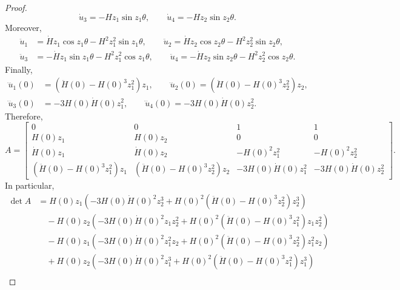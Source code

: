 \documentclass[11pt]{amsart}
\theoremstyle{definition}
\theoremstyle{remark}
\numberwithin{equation}{section}
\begin{document}
\begin{proof}
\begin{equation*}
\dot u_3= -Hz_1\sin z_1 \theta,\qquad
\dot u_4=-Hz_2\sin z_2\theta.
\end{equation*}
Moreover,
\begin{align*}
\ddot u_1&=\dot Hz_1\cos z_1\theta-H^2z_1^2\sin z_1 \theta,\qquad \ddot u_2=\dot Hz_2\cos z_2\theta-H^2z_2^2\sin z_2 \theta,\\
\ddot u_3&=-\dot Hz_1\sin z_1\theta-H^2z_1^2\cos z_1 \theta,\qquad \ddot u_4=-\dot Hz_2\sin z_2\theta-H^2z_2^2\cos z_2 \theta.
\end{align*}
Finally,
\begin{align*}
\dddot u_1(0)&=\left(\ddot H(0)-H(0)^3z_1^2\right)z_1,\qquad  \dddot u_2(0)=\left(\ddot H(0)-H(0)^3z_2^2\right)z_2,\\
\dddot u_3(0)&=-3H(0)\dot H(0)z_1^2,\qquad  \dddot u_4(0)=-3H(0)\dot H(0)z_2^2.
\end{align*}
Therefore, 
\begin{equation*}
A=\begin{bmatrix}
	0 & 0 & 1 & 1 \\
	H(0)z_1 & H(0)z_2 & 0 & 0 \\
	\dot H(0)z_1 & \dot H(0)z_2 & -H(0)^2z_1^2 & -H(0)^2z_2^2 \\
	\left(\ddot H(0)-H(0)^3z_1^2\right)z_1 & \left(\ddot H(0)-H(0)^3z_2^2\right)z_2 & -3H(0)\dot H(0)z_1^2 & -3H(0)\dot H(0)z_2^2
\end{bmatrix}.
\end{equation*}
In particular,
\begin{equation*}
\begin{split}
	\det A &=H(0)z_1\left(-3H(0)\dot H(0)^2z_2^3+ H(0)^2\left(\ddot H(0)-H(0)^3z_2^2\right)z_2^3\right)\\
	&\quad- H(0)z_2\left(-3H(0)\dot H(0)^2z_1z_2^2+ H(0)^2\left(\ddot H(0)-H(0)^3z_1^2\right)z_1z_2^2\right)\\
	&\quad-H(0)z_1\left(-3H(0)\dot H(0)^2z_1^2z_2+ H(0)^2\left(\ddot H(0)-H(0)^3z_2^2\right)z_1^2z_2\right)\\
	&\quad+ H(0)z_2\left(-3H(0)\dot H(0)^2z_1^3+ H(0)^2\left(\ddot H(0)-H(0)^3z_1^2\right)z_1^3\right)\\

\end{split}
\end{equation*}
\end{proof}
\end{document}
